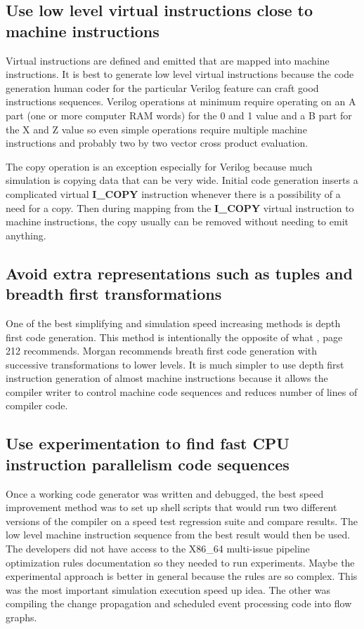\documentclass[preprint, authoryear]{sigplanconf}
\begin{document}
\subsection{Use low level virtual instructions close to machine instructions}
\par
Virtual instructions are defined and emitted that are mapped into
machine instructions.  It is best to generate low level virtual instructions
because the code generation human coder for the particular Verilog feature
can craft good instructions sequences.  Verilog operations at minimum
require operating on an A part (one or more computer
RAM words) for the 0 and 1 value and a B part for the
X and Z value so even simple operations require multiple machine instructions
and probably two by two vector cross product evaluation.
\par
The copy operation is an exception especially for Verilog because
much simulation is copying data that can be very wide.  Initial code
generation inserts a complicated virtual \textbf{I_COPY} instruction
whenever there is a possibility of a need for a copy.  Then during
mapping from the \textbf{I_COPY} virtual instruction to machine instructions,
the copy usually can be removed without needing to emit anything.
\subsection{Avoid extra representations such as tuples and breadth first transformations}
\par
One of the best simplifying and simulation speed increasing methods
is depth first code generation.  This method is intentionally the opposite
of what \cite{Morgan1998}, page 212 recommends.  Morgan recommends breath
first code generation with successive transformations to lower levels.
It is much simpler to use depth first instruction generation of almost machine
instructions because it allows the compiler writer to control machine
code sequences and reduces number of lines of compiler code.
\subsection{Use experimentation to find fast CPU instruction parallelism code sequences}
\par
Once a working code generator was written and debugged, the best
speed improvement method was to set up shell scripts that would run
two different versions of the compiler on a speed test regression suite
and compare results.  The low level machine instruction sequence from the best
result would then be used.
The developers did not have access to the X86_64 multi-issue pipeline
optimization rules documentation so they needed to run experiments.
Maybe the experimental
approach is better in general because the rules are so complex.
This was the most important simulation execution speed up idea.
The other was compiling the change propagation and scheduled
event processing code into flow graphs.
\end{document}
